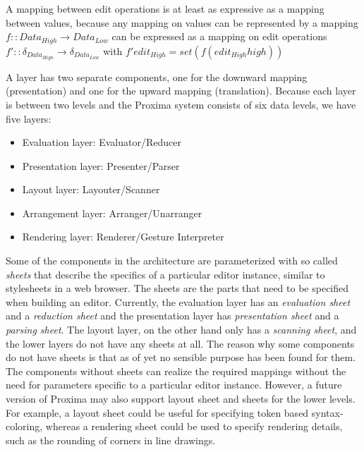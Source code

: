 A mapping between edit operations is at least as expressive as a mapping between values, because any 
mapping on values can be represented by a mapping 
$f :: Data_{High} \rightarrow Data_{Low}$ can be expressed as a mapping on edit operations
$f' ::  \delta_{Data_{High}} \rightarrow \delta_{Data_{Low}}$ with $f' edit_{High} = set (f (edit_{High}high))$
\ec

A layer has two separate components, one for the downward mapping (presentation) and one for the upward mapping (translation). Because each layer is between two levels and the Proxima system consists of six data levels, we have five layers:

\begin{itemize}
\item Evaluation layer: Evaluator/Reducer 
\item Presentation layer: Presenter/Parser
\item Layout layer: Layouter/Scanner
\item Arrangement layer: Arranger/Unarranger
\item Rendering layer: Renderer/Gesture Interpreter
\end{itemize}

Some of the components in the architecture are parameterized with so called {\em sheets} that describe the specifics of a particular editor instance, similar to stylesheets in a web browser. The sheets are the parts that need to be specified when building an editor. Currently, the evaluation layer has an {\em evaluation sheet} and a {\em reduction sheet} and the presentation layer has {\em presentation sheet} and a {\em parsing sheet}.  The layout layer, on the other hand only has a {\em scanning sheet}, and the lower layers do not have any sheets at all. The reason why some components do not have sheets is that as of yet no sensible purpose has been found for them. The components without sheets can realize the required mappings without the need for parameters specific to a particular editor instance. However, a future version of Proxima may also support layout sheet and sheets for the lower levels. For example, a layout sheet could be useful for specifying token based syntax-coloring, whereas a rendering sheet could be used to specify rendering details, such as the rounding of corners in line drawings.

